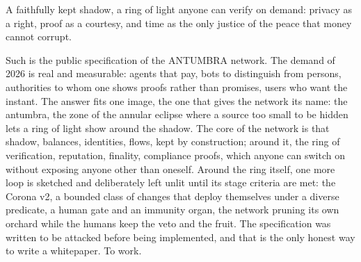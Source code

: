A faithfully kept shadow, a ring of light anyone can verify on demand:
privacy as a right, proof as a courtesy, and time as the only justice
of the peace that money cannot corrupt.

Such is the public specification of the ANTUMBRA network. The demand of
2026 is real and measurable: agents that pay, bots to distinguish from
persons, authorities to whom one shows proofs rather than promises,
users who want the instant. The answer fits one image, the one that
gives the network its name: the antumbra, the zone of the annular
eclipse where a source too small to be hidden lets a ring of light show
around the shadow. The core of the network is that shadow, balances,
identities, flows, kept by construction; around it, the ring of
verification, reputation, finality, compliance proofs, which anyone can
switch on without exposing anyone other than oneself. Around the ring
itself, one more loop is sketched and deliberately left unlit until its
stage criteria are met: the Corona v2, a bounded class of changes that
deploy themselves under a diverse predicate, a human gate and an
immunity organ, the network pruning its own orchard while the humans
keep the veto and the fruit. The specification
was written to be attacked before being implemented, and that is the
only honest way to write a whitepaper. To work.

